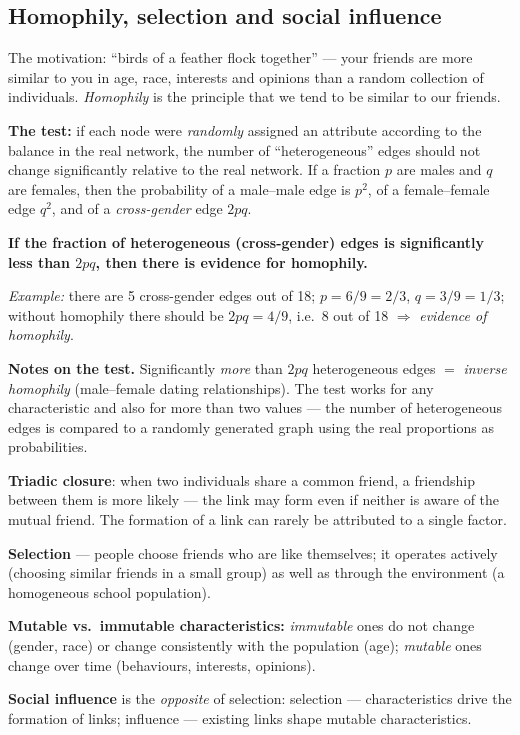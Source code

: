 \documentclass[11pt,a4paper]{article}
\theoremstyle{definition}
\providecommand{\uv}[1]{``#1''}
\begin{document}
\subsection{Homophily, selection and social influence}

\begin{defbox}
The motivation: \uv{birds of a feather flock together} --- your friends are more similar to you in
age, race, interests and opinions than a random collection of individuals. \emph{Homophily} is the
principle that we tend to be similar to our friends.

\textbf{The test:} if each node were \emph{randomly} assigned an attribute according to the balance
in the real network, the number of \uv{heterogeneous} edges should not change significantly relative
to the real network. If a fraction $p$ are males and $q$ are females, then the probability of a
male--male edge is $p^2$, of a female--female edge $q^2$, and of a \emph{cross-gender} edge $2pq$.

\textbf{If the fraction of heterogeneous (cross-gender) edges is significantly less than $2pq$, then
there is evidence for homophily.}

\emph{Example:} there are 5 cross-gender edges out of 18; $p=6/9=2/3$, $q=3/9=1/3$; without
homophily there should be $2pq=4/9$, i.e.\ 8 out of 18 $\Rightarrow$ \emph{evidence of homophily}.
\end{defbox}

\textbf{Notes on the test.} Significantly \emph{more} than $2pq$ heterogeneous edges $=$
\emph{inverse homophily} (male--female dating relationships). The test works for any
characteristic and also for more than two values --- the number of heterogeneous edges is
compared to a randomly generated graph using the real proportions as probabilities.

\begin{defbox}
\textbf{Triadic closure}: when two individuals share a common friend, a friendship between
them is more likely --- the link may form even if neither is aware of the mutual friend.
The formation of a link can rarely be attributed to a single factor.

\textbf{Selection} --- people choose friends who are like themselves; it operates actively
(choosing similar friends in a small group) as well as through the environment (a homogeneous
school population).

\textbf{Mutable vs.\ immutable characteristics:} \emph{immutable} ones do not change (gender,
race) or change consistently with the population (age); \emph{mutable} ones change over time
(behaviours, interests, opinions).

\textbf{Social influence} is the \emph{opposite} of selection: selection --- characteristics
drive the formation of links; influence --- existing links shape mutable characteristics.
\end{defbox}
\end{document}
